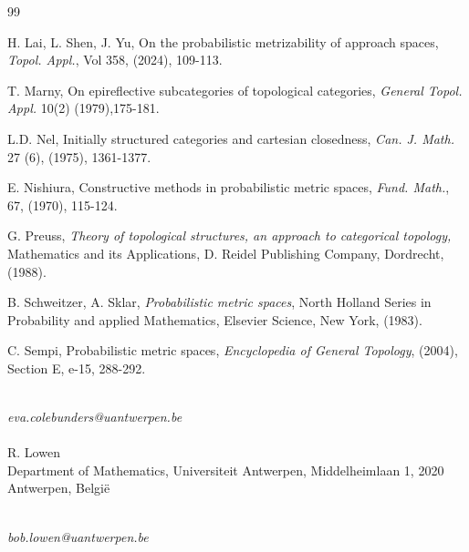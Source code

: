 \documentclass[12pt,a4paper]{amsart}
\theoremstyle{theorem}
\theoremstyle{definition}
\begin{document}
{\begin{thebibliography}{99}
 
 H. Lai, L. Shen, J. Yu, On the probabilistic metrizability of approach spaces, \emph{Topol. Appl.}, Vol 358, (2024), 109-113.
 


 T. Marny, On epireflective subcategories of topological categories, \emph{General Topol. Appl.} 10(2) (1979),175-181.

 L.D. Nel, Initially structured categories and cartesian closedness, \emph{Can. J. Math.} 27 (6), (1975), 1361-1377.

 E. Nishiura, Constructive methods in probabilistic metric spaces, \emph{Fund. Math.}, 67, (1970), 115-124.

 G. Preuss, \emph{Theory of topological structures, an approach to categorical topology,} Mathematics and its Applications, D. Reidel Publishing Company, Dordrecht, (1988).

 B. Schweitzer, A. Sklar, \emph{Probabilistic metric spaces}, North Holland Series in Probability and applied Mathematics, Elsevier Science, New York, (1983).

 C. Sempi, Probabilistic metric spaces, \emph{Encyclopedia of General Topology}, (2004), Section E, e-15, 288-292.




 
  
\end{thebibliography}

\vspace{1cm}

\vspace{1cm}
\\
\emph{eva.colebunders@uantwerpen.be}\\
 \\
R. Lowen \\
Department of Mathematics, Universiteit Antwerpen, Middelheimlaan 1, 2020 Antwerpen, Belgi\"{e}}\\
\emph{bob.lowen@uantwerpen.be}
\end{document}
